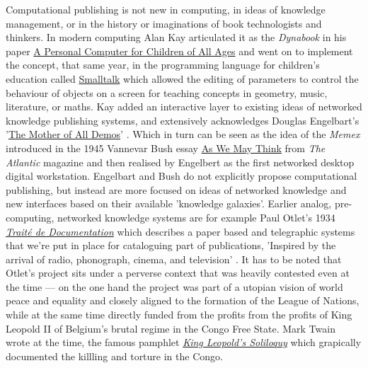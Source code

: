 \documentclass{article}
\begin{document}
\begin{itemize}
Computational publishing is not new in computing, in ideas of knowledge management, or in the history or imaginations of book technologists and thinkers. In modern computing Alan Kay articulated it as the \emph{Dynabook} \autocite{OdewahnAndrew20210619T14:43:08Z} in his paper \href{https://dl.acm.org/doi/abs/10.1145/800193.1971922?msclkid=2aa89ce0d03c11ec81b1043fb5e37b40}{A Personal Computer for Children of All Ages} \autocite{KayAlan1972} and went on to implement the concept, that same year, in the programming language for children's education called \href{https://en.wikipedia.org/wiki/Smalltalk}{Smalltalk} which allowed the editing of parameters to control the behaviour of objects on a screen for teaching concepts in geometry, music, literature, or maths. Kay added an interactive layer to existing ideas of networked knowledge publishing systems, and extensively acknowledges Douglas Engelbart's '\href{https://www.youtube.com/watch?v=yJDv-zdhzMY}{The Mother of All Demos}' \autocite{EngelbertDouglas1968}. Which in turn can be seen as the idea of the \emph{Memex} introduced in the 1945 Vannevar Bush essay \href{https://en.wikipedia.org/wiki/As_We_May_Think}{As We May Think} from \emph{The Atlantic} magazine \autocite{BushVannevar19450701} and then realised by Engelbert as the first networked desktop digital workstation. Engelbart and Bush do not explicitly propose computational publishing, but instead are more focused on ideas of networked knowledge and new interfaces based on their available 'knowledge galaxies'. Earlier analog, pre-computing, networked knowledge systems are for example Paul Otlet's 1934 \emph{\href{https://archive.org/details/OtletTraitDocumentationUgent/mode/2up?msclkid=329a575ad03a11ec870080b223f9d3a0}{Traité de Documentation}} \autocite{OtletPaul1934} which describes a paper based and telegraphic systems that we're put in place for cataloguing part of publications, 'Inspired by the arrival of radio, phonograph, cinema, and television' \autocite{ReagleJoseph2012}. It has to be noted that Otlet's project sits under a perverse context that was heavily contested even at the time — on the one hand the project was part of a utopian vision of world peace and equality and closely aligned to the formation of the League of Nations, while at the same time directly funded from the profits from the profits of King Leopold II of Belgium's brutal regime in the Congo Free State. Mark Twain wrote at the time, the famous pamphlet \emph{\href{https://archive.org/details/kingleopoldssoli00twaiuoft/page/n1/mode/2up}{King Leopold's Soliloquy}} \autocite{TwainMark1905} which grapically documented the killling and torture in the Congo.  



\end{itemize}
\end{document}
